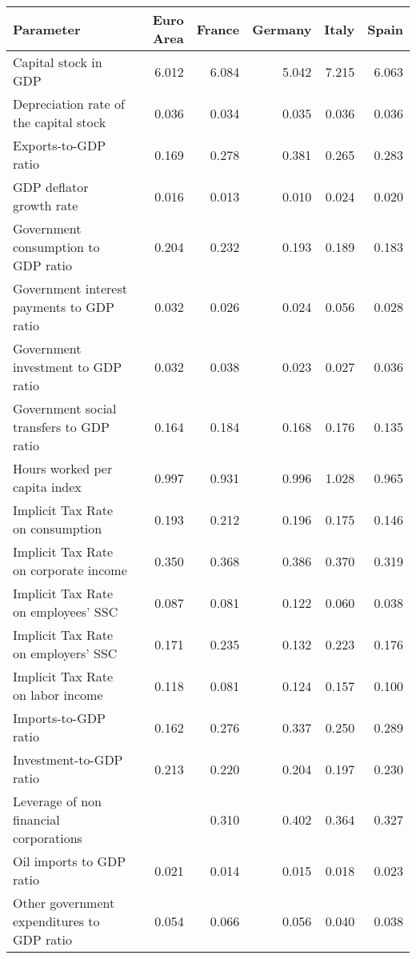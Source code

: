 \begin{table}[ht]
\centering
\begin{tabular}{lrrrrr}
  \hline
Parameter & Euro Area & France & Germany & Italy & Spain \\ 
  \hline
Capital stock in GDP & 6.012 & 6.084 & 5.042 & 7.215 & 6.063 \\ 
  Depreciation rate 
 of the capital stock & 0.036 & 0.034 & 0.035 & 0.036 & 0.036 \\ 
  Exports-to-GDP ratio & 0.169 & 0.278 & 0.381 & 0.265 & 0.283 \\ 
  GDP deflator 
 growth rate & 0.016 & 0.013 & 0.010 & 0.024 & 0.020 \\ 
  Government consumption 
 to GDP ratio & 0.204 & 0.232 & 0.193 & 0.189 & 0.183 \\ 
  Government interest 
 payments to GDP ratio & 0.032 & 0.026 & 0.024 & 0.056 & 0.028 \\ 
  Government investment 
 to GDP ratio & 0.032 & 0.038 & 0.023 & 0.027 & 0.036 \\ 
  Government social 
 transfers to GDP ratio & 0.164 & 0.184 & 0.168 & 0.176 & 0.135 \\ 
  Hours worked per 
 capita index & 0.997 & 0.931 & 0.996 & 1.028 & 0.965 \\ 
  Implicit Tax Rate 
 on consumption & 0.193 & 0.212 & 0.196 & 0.175 & 0.146 \\ 
  Implicit Tax Rate 
 on corporate income & 0.350 & 0.368 & 0.386 & 0.370 & 0.319 \\ 
  Implicit Tax Rate 
 on employees' SSC & 0.087 & 0.081 & 0.122 & 0.060 & 0.038 \\ 
  Implicit Tax Rate 
 on employers' SSC & 0.171 & 0.235 & 0.132 & 0.223 & 0.176 \\ 
  Implicit Tax Rate 
 on labor income  & 0.118 & 0.081 & 0.124 & 0.157 & 0.100 \\ 
  Imports-to-GDP ratio & 0.162 & 0.276 & 0.337 & 0.250 & 0.289 \\ 
  Investment-to-GDP ratio & 0.213 & 0.220 & 0.204 & 0.197 & 0.230 \\ 
  Leverage of non 
 financial corporations &  & 0.310 & 0.402 & 0.364 & 0.327 \\ 
  Oil imports to GDP ratio & 0.021 & 0.014 & 0.015 & 0.018 & 0.023 \\ 
  Other government 
 expenditures to GDP ratio & 0.054 & 0.066 & 0.056 & 0.040 & 0.038 \\ 

\end{tabular}
\end{table}
